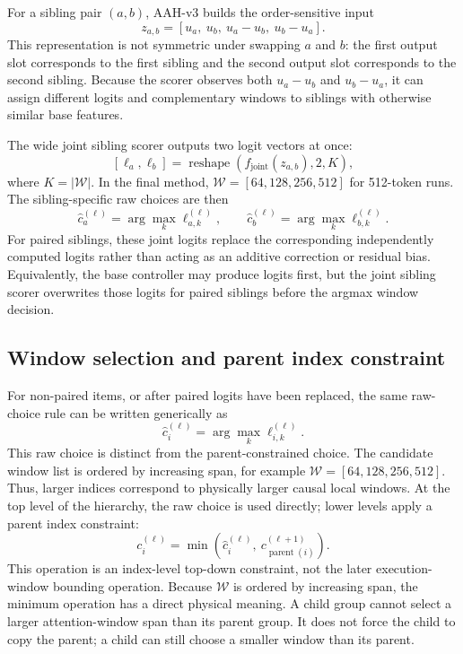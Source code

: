 \documentclass[11pt]{article}
\begin{document}
For a sibling pair \((a,b)\), AAH-v3 builds the order-sensitive input
\[
  z_{a,b} = [u_a,\ u_b,\ u_a-u_b,\ u_b-u_a].
\]
This representation is not symmetric under swapping \(a\) and \(b\): the first output slot corresponds to the first sibling and the second output slot corresponds to the second sibling. Because the scorer observes both \(u_a-u_b\) and \(u_b-u_a\), it can assign different logits and complementary windows to siblings with otherwise similar base features.

The wide joint sibling scorer outputs two logit vectors at once:
\[
  [\ell_a,\ell_b] = \operatorname{reshape}(f_{\text{joint}}(z_{a,b}), 2, K),
\]
where \(K=|\mathcal W|\). In the final method, \(\mathcal W=[64,128,256,512]\) for 512-token runs. The sibling-specific raw choices are then
\[
  \hat c_a^{(\ell)}=\arg\max_k \ell_{a,k}^{(\ell)}, \qquad
  \hat c_b^{(\ell)}=\arg\max_k \ell_{b,k}^{(\ell)}.
\]
For paired siblings, these joint logits replace the corresponding independently computed logits rather than acting as an additive correction or residual bias. Equivalently, the base controller may produce logits first, but the joint sibling scorer overwrites those logits for paired siblings before the argmax window decision.

\subsection{Window selection and parent index constraint}

For non-paired items, or after paired logits have been replaced, the same raw-choice rule can be written generically as
\[
  \hat c_i^{(\ell)} = \arg\max_k \ell_{i,k}^{(\ell)}.
\]
This raw choice is distinct from the parent-constrained choice. The candidate window list is ordered by increasing span, for example \(\mathcal W=[64,128,256,512]\). Thus, larger indices correspond to physically larger causal local windows. At the top level of the hierarchy, the raw choice is used directly; lower levels apply a parent index constraint:
\[
  c_i^{(\ell)} = \min(\hat c_i^{(\ell)},\ c_{\operatorname{parent}(i)}^{(\ell+1)}).
\]
This operation is an index-level top-down constraint, not the later execution-window bounding operation. Because \(\mathcal W\) is ordered by increasing span, the minimum operation has a direct physical meaning. A child group cannot select a larger attention-window span than its parent group. It does not force the child to copy the parent; a child can still choose a smaller window than its parent.
\end{document}
